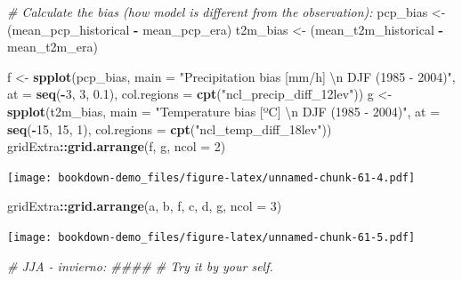\documentclass[]{book}
\newenvironment{Shaded}{\begin{snugshade}}{\end{snugshade}}
\newcommand{\CharTok}[1]{\textcolor[rgb]{0.31,0.60,0.02}{#1}}
\newcommand{\CommentTok}[1]{\textcolor[rgb]{0.56,0.35,0.01}{\textit{#1}}}
\newcommand{\DataTypeTok}[1]{\textcolor[rgb]{0.13,0.29,0.53}{#1}}
\newcommand{\DecValTok}[1]{\textcolor[rgb]{0.00,0.00,0.81}{#1}}
\newcommand{\FloatTok}[1]{\textcolor[rgb]{0.00,0.00,0.81}{#1}}
\newcommand{\KeywordTok}[1]{\textcolor[rgb]{0.13,0.29,0.53}{\textbf{#1}}}
\newcommand{\NormalTok}[1]{#1}
\newcommand{\OperatorTok}[1]{\textcolor[rgb]{0.81,0.36,0.00}{\textbf{#1}}}
\newcommand{\StringTok}[1]{\textcolor[rgb]{0.31,0.60,0.02}{#1}}
\begin{document}
\begin{Shaded}
\begin{Highlighting}[]
\CommentTok{# Calculate the bias (how model is different from the observation):}
\NormalTok{pcp_bias <-}\StringTok{ }\NormalTok{(mean_pcp_historical }\OperatorTok{-}\StringTok{ }\NormalTok{mean_pcp_era)}
\NormalTok{t2m_bias <-}\StringTok{ }\NormalTok{(mean_t2m_historical }\OperatorTok{-}\StringTok{ }\NormalTok{mean_t2m_era)}


\NormalTok{f <-}\StringTok{ }\KeywordTok{spplot}\NormalTok{(pcp_bias,}
            \DataTypeTok{main =} \StringTok{"Precipitation bias [mm/h] }\CharTok{\textbackslash{}n}\StringTok{ DJF (1985 - 2004)"}\NormalTok{,}
            \DataTypeTok{at =} \KeywordTok{seq}\NormalTok{(}\OperatorTok{-}\DecValTok{3}\NormalTok{, }\DecValTok{3}\NormalTok{, }\FloatTok{0.1}\NormalTok{),}
            \DataTypeTok{col.regions =} \KeywordTok{cpt}\NormalTok{(}\StringTok{"ncl_precip_diff_12lev"}\NormalTok{))}
\NormalTok{g <-}\StringTok{ }\KeywordTok{spplot}\NormalTok{(t2m_bias,}
            \DataTypeTok{main =} \StringTok{"Temperature bias [ºC] }\CharTok{\textbackslash{}n}\StringTok{ DJF (1985 - 2004)"}\NormalTok{,}
            \DataTypeTok{at =} \KeywordTok{seq}\NormalTok{(}\OperatorTok{-}\DecValTok{15}\NormalTok{, }\DecValTok{15}\NormalTok{, }\DecValTok{1}\NormalTok{),}
            \DataTypeTok{col.regions =} \KeywordTok{cpt}\NormalTok{(}\StringTok{"ncl_temp_diff_18lev"}\NormalTok{))}
\NormalTok{gridExtra}\OperatorTok{::}\KeywordTok{grid.arrange}\NormalTok{(f, g, }\DataTypeTok{ncol =} \DecValTok{2}\NormalTok{)}
\end{Highlighting}
\end{Shaded}

\texttt{[image: bookdown-demo\_files/figure-latex/unnamed-chunk-61-4.pdf]}

\begin{Shaded}
\begin{Highlighting}[]
\NormalTok{gridExtra}\OperatorTok{::}\KeywordTok{grid.arrange}\NormalTok{(a, b, f,}
\NormalTok{                        c, d, g,  }\DataTypeTok{ncol =} \DecValTok{3}\NormalTok{)}
\end{Highlighting}
\end{Shaded}

\texttt{[image: bookdown-demo\_files/figure-latex/unnamed-chunk-61-5.pdf]}

\begin{Shaded}
\begin{Highlighting}[]
\CommentTok{# JJA - invierno: ####}
\CommentTok{# Try it by your self.}
\end{Highlighting}
\end{Shaded}
\end{document}
